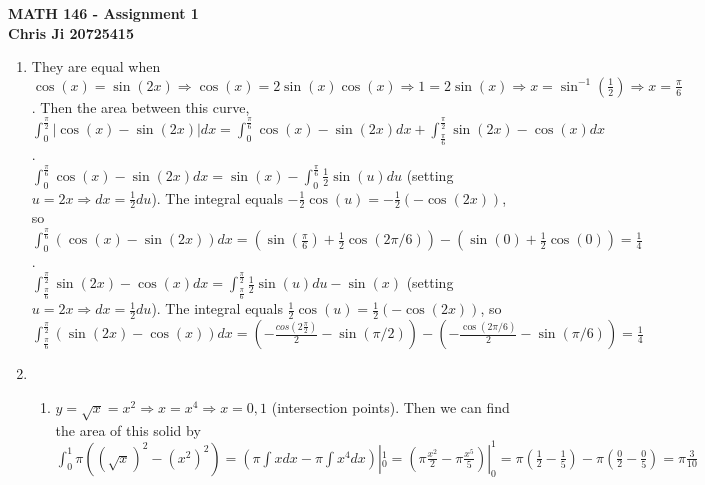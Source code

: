 \documentclass[10pt,english]{article}
\begin{document}
\noindent \begin{center}
\textbf{\large{}MATH 146 - Assignment 1}\\
\textbf{\large{}Chris Ji 20725415}
\par\end{center}{\large \par}
\medskip{}

\begin{enumerate}
\item They are equal when $\cos(x)=\sin(2x)\Rightarrow \cos(x)=2\sin(x)\cos(x)\Rightarrow 1=2\sin(x)\Rightarrow x=\sin^{-1}\left(\frac{1}{2}\right)\Rightarrow x=\frac{\pi}{6}$. Then the area between this curve, $\int_0^{\frac{\pi}{2}}|\cos(x)-\sin(2x)|dx=\int_0^{\frac{\pi}{6}}\cos(x)-\sin(2x)dx+\int_{\frac{\pi}{6}}^\frac{\pi}{2}\sin(2x)-\cos(x)dx$. \\ 
$\int_0^\frac{\pi}{6}\cos(x)-\sin(2x)dx=\sin(x)-\int_0^\frac{\pi}{6}\frac{1}{2}\sin(u)du$ (setting $u=2x\Rightarrow dx=\frac{1}{2}du$). The integral equals $-\frac{1}{2}\cos(u)=-\frac{1}{2}(-\cos(2x))$, so $\int_0^\frac{\pi}{6}(\cos(x)-\sin(2x))dx=(\sin(\frac{\pi}{6})+\frac{1}{2}\cos(2\pi/6))-(\sin(0)+\frac{1}{2}\cos(0))=\frac{1}{4}$. \\ 
$\int_\frac{\pi}{6}^\frac{\pi}{2}\sin(2x)-\cos(x)dx=\int_\frac{\pi}{6}^\frac{\pi}{2}\frac{1}{2}\sin(u)du-\sin(x)$ (setting $u=2x\Rightarrow dx=\frac{1}{2}du$). The integral equals $\frac{1}{2}\cos(u)=\frac{1}{2}(-\cos(2x))$, so $\int_\frac{\pi}{6}^\frac{\pi}{2}(\sin(2x)-\cos(x))dx=(-\frac{cos(2\frac{\pi}{2})}{2}-\sin(\pi/2))-(-\frac{\cos(2\pi/6)}{2}-\sin(\pi/6))=\frac{1}{4}$

\pagebreak
\item \begin{enumerate}
    \item $y=\sqrt{x}=x^2\Rightarrow x=x^4\Rightarrow x=0,1$ (intersection points). Then we can find the area of this solid by $\int_0^1\pi((\sqrt{x})^2-(x^2)^2)=(\pi\int xdx-\pi\int x^4dx)|_0^1=(\pi\frac{x^2}{2}-\pi\frac{x^5}{5})|_0^1=\pi(\frac{1}{2}-\frac{1}{5})-\pi(\frac{0}{2}-\frac{0}{5})=\pi\frac{3}{10}$
    

\end{enumerate}
\end{enumerate}
\end{document}
